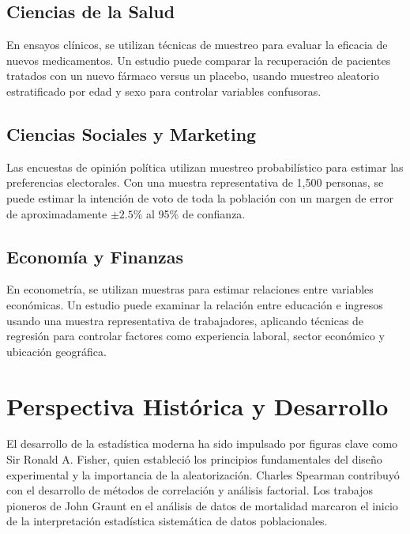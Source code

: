 \subsection{Ciencias de la Salud}

\begin{example}
En ensayos clínicos, se utilizan técnicas de muestreo para evaluar la eficacia de nuevos medicamentos. Un estudio puede comparar la recuperación de pacientes tratados con un nuevo fármaco versus un placebo, usando muestreo aleatorio estratificado por edad y sexo para controlar variables confusoras.
\end{example}

\subsection{Ciencias Sociales y Marketing}

\begin{example}
Las encuestas de opinión política utilizan muestreo probabilístico para estimar las preferencias electorales. Con una muestra representativa de 1,500 personas, se puede estimar la intención de voto de toda la población con un margen de error de aproximadamente $\pm 2.5\%$ al 95\% de confianza.
\end{example}

\subsection{Economía y Finanzas}

\begin{example}
En econometría, se utilizan muestras para estimar relaciones entre variables económicas. Un estudio puede examinar la relación entre educación e ingresos usando una muestra representativa de trabajadores, aplicando técnicas de regresión para controlar factores como experiencia laboral, sector económico y ubicación geográfica.
\end{example}

\section{Perspectiva Histórica y Desarrollo}

\begin{remark}
El desarrollo de la estadística moderna ha sido impulsado por figuras clave como Sir Ronald A. Fisher, quien estableció los principios fundamentales del diseño experimental y la importancia de la aleatorización. Charles Spearman contribuyó con el desarrollo de métodos de correlación y análisis factorial. Los trabajos pioneros de John Graunt en el análisis de datos de mortalidad marcaron el inicio de la interpretación estadística sistemática de datos poblacionales.
\end{remark}

